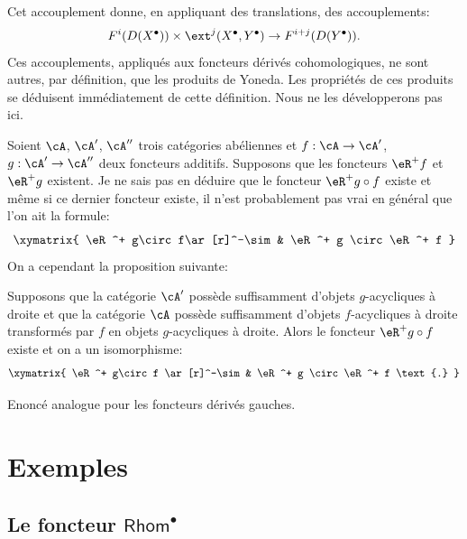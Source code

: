 Cet accouplement donne, en appliquant des translations, des accouplements: 
\[
  F^i(D(X^\bullet))\times \ext^j(X^\bullet,Y^\bullet) \to F^{i+j}(D(Y^\bullet)) \text{.}
\]
Ces accouplements, appliqués aux foncteurs dérivés cohomologiques, ne 
sont autres, par définition, que les produits de Yoneda. Les propriétés 
de ces produits se déduisent immédiatement de cette définition. Nous ne 
les développerons pas ici. 

Soient $\cA$, $\cA'$, $\cA''$ trois catégories abéliennes et 
$f:\cA\to \cA'$, $g:\cA'\to \cA''$ deux foncteurs additifs. Supposons que les 
foncteurs $\eR^+ f$ et $\eR^+ g$ existent. Je ne sais pas en déduire que le 
foncteur $\eR^+ g\circ f$ existe et même si ce dernier foncteur existe, il 
n'est probablement pas vrai en général que l'on ait la formule: 
\[\xymatrix{
  \eR^+ g\circ f\ar[r]^-\sim 
    & \eR^+ g \circ \eR^+ f 
}\]
On a cependant la proposition suivante: 





\begin{proposition}\label{VIII:4-3-1}
Supposons que la catégorie $\cA'$ possède suffisamment d'objets 
$g$-acycliques à droite et que la catégorie $\cA$ possède suffisamment 
d'objets $f$-acycliques à droite transformés par $f$ en objets 
$g$-acycliques à droite. Alors le foncteur $\eR^+ g\circ f$ existe et on a un 
isomorphisme: 
\[\xymatrix{
  \eR^+ g\circ f \ar[r]^-\sim 
    & \eR^+ g \circ \eR^+ f \text{.}
}\]
\end{proposition}

Enoncé analogue pour les foncteurs dérivés gauches. 















\section{Exemples}\label{VIII:6} %










\subsection{Le foncteur \texorpdfstring{$\mathsf{Rhom}^\bullet$}{Hom*}}\label{VIII:6-1}

